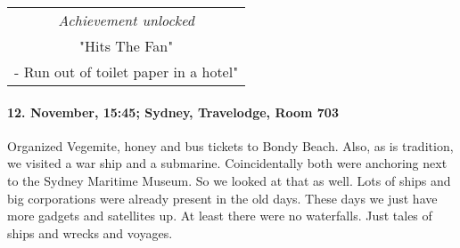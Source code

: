 \begin{center}
\begin{tabular}{||c||}
\emph{Achievement unlocked}\\
"Hits The Fan"\\
\multicolumn{1}{||p{0.8\textwidth}||}{\footnotesize - Run out of toilet paper in a hotel"} \\
\end{tabular}
\end{center}

\paragraph{12. November, 15:45; Sydney, Travelodge, Room 703}
Organized Vegemite, honey and bus tickets to Bondy Beach.
Also, as is tradition, we visited a war ship and a submarine.
Coincidentally both were anchoring next to the Sydney Maritime Museum.
So we looked at that as well.
Lots of ships and big corporations were already present in the old days.
These days we just have more gadgets and satellites up.
At least there were no waterfalls.
Just tales of ships and wrecks and voyages.